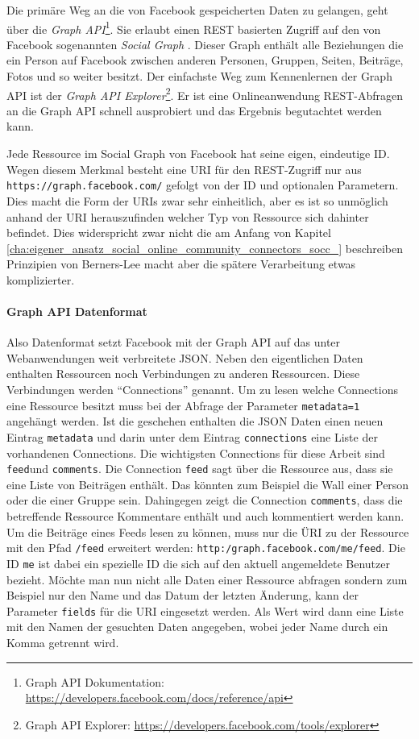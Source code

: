 Die primäre Weg an die von Facebook gespeicherten Daten zu gelangen, geht über die \emph{Graph API}\footnote{Graph API Dokumentation:  \url{https://developers.facebook.com/docs/reference/api}}. Sie erlaubt einen REST basierten Zugriff auf den von Facebook sogenannten \emph{Social Graph} \cite{FacebookGraphAPI}. Dieser Graph enthält alle Beziehungen die ein Person auf Facebook zwischen anderen Personen, Gruppen, Seiten, Beiträge, Fotos und so weiter besitzt. Der einfachste Weg zum Kennenlernen der Graph API ist der \emph{Graph API Explorer}\footnote{Graph API Explorer: \url{https://developers.facebook.com/tools/explorer}}. Er ist eine Onlineanwendung REST-Abfragen an die Graph API schnell ausprobiert und das Ergebnis begutachtet werden kann.

Jede Ressource im Social Graph von Facebook hat seine eigen, eindeutige ID. Wegen diesem Merkmal besteht eine URI für den REST-Zugriff nur aus \texttt{https://graph.facebook.com/} gefolgt von der ID und optionalen Parametern. Dies macht die Form der URIs zwar sehr einheitlich, aber es ist so unmöglich anhand der URI herauszufinden welcher Typ von Ressource sich dahinter befindet. Dies widerspricht zwar nicht die am Anfang von Kapitel \ref{cha:eigener_ansatz_social_online_community_connectors_socc_} beschreiben Prinzipien von Berners-Lee macht aber die spätere Verarbeitung etwas komplizierter. 

\paragraph{Graph API Datenformat} %
\label{par:graph_api_datenformat}

Also Datenformat setzt Facebook mit der Graph API auf das unter Webanwendungen weit verbreitete JSON. Neben den eigentlichen Daten enthalten Ressourcen noch Verbindungen zu anderen Ressourcen. Diese Verbindungen werden \enquote{Connections} genannt. Um zu lesen welche Connections eine Ressource besitzt muss bei der Abfrage der Parameter \texttt{metadata=1} angehängt werden. Ist die geschehen enthalten die JSON Daten einen neuen Eintrag \texttt{metadata} und darin unter dem Eintrag \texttt{connections} eine Liste der vorhandenen Connections. Die wichtigsten Connections für diese Arbeit sind \texttt{feed}und \texttt{comments}. Die Connection \texttt{feed} sagt über die Ressource aus, dass sie eine Liste von Beiträgen enthält. Das könnten zum Beispiel die Wall einer Person oder die einer Gruppe sein. Dahingegen zeigt die Connection \texttt{comments}, dass die betreffende Ressource Kommentare enthält und auch kommentiert werden kann. Um die Beiträge eines Feeds lesen zu können, muss nur die ÜRI zu der Ressource mit den Pfad \texttt{/feed} erweitert werden: \texttt{http:/graph.facebook.com/me/feed}. Die ID \texttt{me} ist dabei ein spezielle ID die sich auf den aktuell angemeldete Benutzer bezieht. Möchte man nun nicht alle Daten einer Ressource abfragen sondern zum Beispiel nur den Name und das Datum der letzten Änderung, kann der Parameter \texttt{fields} für die URI eingesetzt werden. Als Wert wird dann eine Liste mit den Namen der gesuchten Daten angegeben, wobei jeder Name durch ein Komma getrennt wird. 

